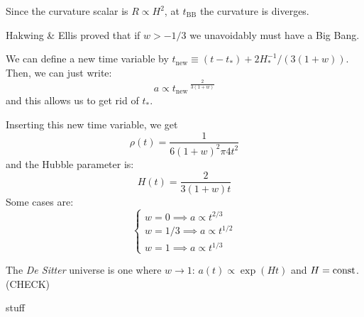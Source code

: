 \documentclass[main.tex]{subfiles}
\begin{document}
Since the curvature scalar is \(R \propto H^2\), at \(t_{\text{BB}}\)  the curvature is diverges.

Hakwing \& Ellis proved that if \(w>-1/3\) we unavoidably must have a Big Bang.

We can define a new time variable by \(t_{\text{new}} \equiv (t - t_{*}) + 2 H_*^{-1} / (3 (1+w))\). Then, we can just write:
\begin{equation}
  a \propto t_{\text{new}}\,^{\frac{2}{3(1+w)}}
\end{equation}
and this allows us to get rid of \(t_{*}\).

Inserting this new time variable, we get
\begin{equation}
  \rho(t) = \frac{1}{6 (1+w)^2 \pi 4 t^2}
\end{equation}
and the Hubble parameter is:
\begin{equation}
  H(t) = \frac{2}{3(1+w) t}
\end{equation}
Some cases are:
\begin{equation}
  \begin{cases}
      w = 0 \implies a \propto t^{2/3}  \\
      w=1/3 \implies a \propto t^{1/2} \\  
      w=1 \implies a \propto t^{1/3}  
  \end{cases}
\end{equation}

The \emph{De Sitter} universe is one where \(w \rightarrow 1\): \(a(t) \propto \exp(Ht) \) and \(H = \text{const}\). (CHECK) 

stuff
\end{document}

